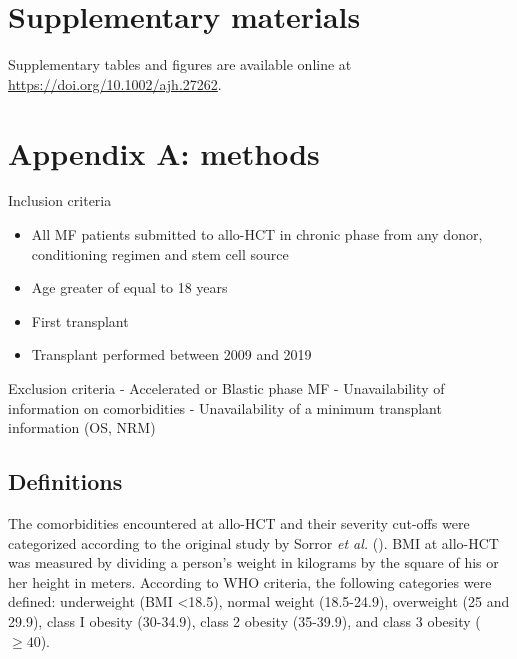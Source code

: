 \documentclass[
  letterpaper,
  DIV=11,
  numbers=noendperiod]{scrreprt}
\providecommand{\tightlist}{%
  \setlength{\itemsep}{0pt}\setlength{\parskip}{0pt}}\usepackage{longtable,booktabs,array}
\begin{document}
\section*{Supplementary materials}\label{supplementary-materials-2}


Supplementary tables and figures are available online at
\url{https://doi.org/10.1002/ajh.27262}.

\section*{Appendix A: methods}\label{appendix-a-methods}


Inclusion criteria

\begin{itemize}
\tightlist
\item
  All MF patients submitted to allo-HCT in chronic phase from any donor,
  conditioning regimen and stem cell source
\item
  Age greater of equal to 18 years
\item
  First transplant
\item
  Transplant performed between 2009 and 2019
\end{itemize}

Exclusion criteria - Accelerated or Blastic phase MF - Unavailability of
information on comorbidities - Unavailability of a minimum transplant
information (OS, NRM)

\subsection*{Definitions}\label{definitions}

The comorbidities encountered at allo-HCT and their severity cut-offs
were categorized according to the original study by Sorror \emph{et al.}
(). BMI
at allo-HCT was measured by dividing a person's weight in kilograms by
the square of his or her height in meters. According to WHO criteria,
the following categories were defined: underweight (BMI \textless18.5),
normal weight (18.5-24.9), overweight (25 and 29.9), class I obesity
(30-34.9), class 2 obesity (35-39.9), and class 3 obesity (\(\geq 40\)).
\end{document}
